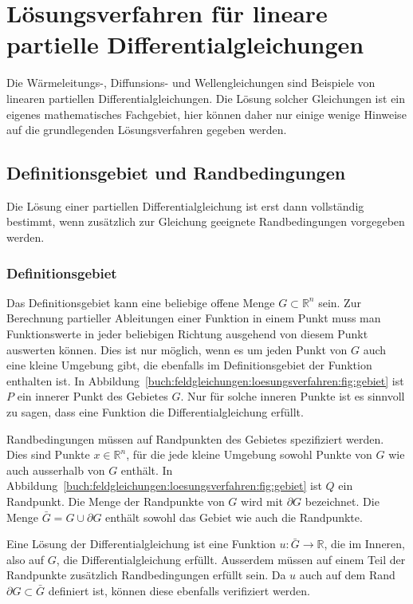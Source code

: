 %
%
\section{Lösungsverfahren für lineare partielle Differentialgleichungen}
Die Wärmeleitungs-, Diffunsions- und Wellengleichungen sind Beispiele
von linearen partiellen Differentialgleichungen.
Die Lösung solcher Gleichungen ist ein eigenes mathematisches
Fachgebiet, hier können daher nur einige wenige Hinweise auf die
grundlegenden Lösungsverfahren gegeben werden.

%
%
\subsection{Definitionsgebiet und Randbedingungen}
%
Die Lösung einer partiellen Differentialgleichung ist erst dann vollständig
bestimmt, wenn zusätzlich zur Gleichung geeignete Randbedingungen
vorgegeben werden.

%
%
\subsubsection{Definitionsgebiet}
Das Definitionsgebiet kann eine beliebige offene Menge $G\subset\mathbb{R}^n$
sein.
Zur Berechnung partieller Ableitungen einer Funktion in einem Punkt
muss man Funktionswerte in jeder beliebigen Richtung ausgehend von
diesem Punkt auswerten können.
Dies ist nur möglich, wenn es um jeden Punkt von $G$ auch eine kleine
Umgebung gibt, die ebenfalls im Definitionsgebiet der Funktion enthalten
ist.
In Abbildung~\ref{buch:feldgleichungen:loesungsverfahren:fig:gebiet}
ist $P$ ein innerer Punkt des Gebietes $G$.
Nur für solche inneren Punkte ist es sinnvoll zu sagen, dass eine
Funktion die Differentialgleichung erfüllt.

Randbedingungen müssen auf Randpunkten des Gebietes spezifiziert werden.
Dies sind Punkte $x\in\mathbb{R}^n$, für die jede kleine Umgebung sowohl
Punkte von $G$ wie auch ausserhalb von $G$ enthält.
In Abbildung~\ref{buch:feldgleichungen:loesungsverfahren:fig:gebiet}
ist $Q$ ein Randpunkt.
Die Menge der Randpunkte von $G$ wird mit $\partial G$ bezeichnet.
Die Menge $\bar{G}=G\cup \partial G$ enthält sowohl das Gebiet
wie auch die Randpunkte.

Eine Lösung der Differentialgleichung ist eine Funktion
$u\colon\bar{G}\to\mathbb{R}$, die im Inneren, also auf $G$,
die Differentialgleichung erfüllt.
Ausserdem müssen auf einem Teil der Randpunkte zusätzlich
Randbedingungen erfüllt sein.
Da $u$ auch auf dem Rand $\partial G\subset\bar{G}$ definiert
ist, können diese ebenfalls verifiziert werden.

